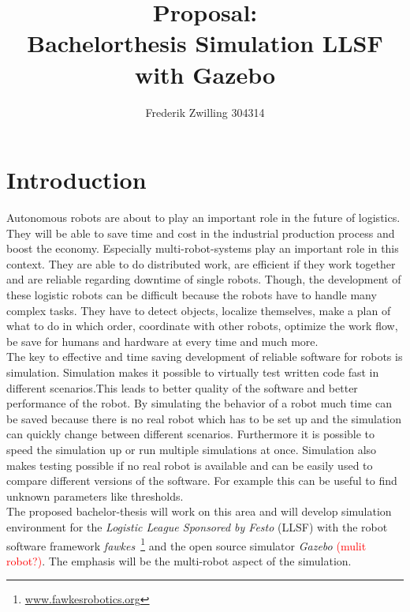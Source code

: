 \documentclass[11pt,a4paper,titlepage]{article}
\author{Frederik Zwilling 304314}
\title{Proposal:\\ Bachelorthesis Simulation LLSF with Gazebo}
\begin{document}
\maketitle

\section{Introduction}
Autonomous robots are about to play an important role in the future of logistics. They will be able to save time and cost in the industrial production process and boost the economy. Especially multi-robot-systems play an important role in this context. They are able to do distributed work, are efficient if they work together and are reliable regarding downtime of single robots. Though, the development of these logistic robots can be difficult because the robots have to handle many complex tasks. They have to detect objects, localize themselves, make a plan of what to do in which order, coordinate with other robots, optimize the work flow, be save for humans and hardware at every time and much more.\\
The key to effective and time saving development of reliable software for robots is simulation. Simulation makes it possible to virtually test written code fast in different scenarios.This leads to better quality of the software and better performance of the robot. By simulating the behavior of a robot much time can be saved because there is no real robot which has to be set up and the simulation can quickly change between different scenarios. Furthermore it is possible to speed the simulation up or run multiple simulations at once. Simulation also makes testing possible if no real robot is available and can be easily used to compare different versions of the software. For example this can be useful to find unknown parameters like thresholds.\\
The proposed bachelor-thesis will work on this area and will develop simulation environment for the \textit{Logistic League Sponsored by Festo} (LLSF) with the robot software framework \textit{fawkes}~\footnote{\url{www.fawkesrobotics.org}} and the open source simulator \textit{Gazebo} \textcolor{red}{(mulit robot?)}. The emphasis will be the multi-robot aspect of the simulation.
\end{document}

